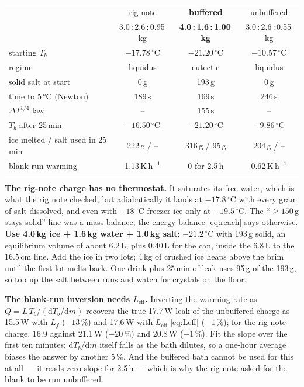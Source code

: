\documentclass[11pt,a4paper]{article}
\newcommand{\dC}{\,^{\circ}\mathrm{C}}
\begin{document}
\begin{center}\small
\begin{tabular}{@{}l c c c@{}}
\toprule
& rig note & \textbf{buffered} & unbuffered \\
& 3.0\,:\,2.6\,:\,0.95\,kg & \textbf{4.0\,:\,1.6\,:\,1.00\,kg} & 3.0\,:\,2.6\,:\,0.55\,kg \\ \midrule
starting $T_b$ & $-17.78\dC$ & $\mathbf{-21.20\dC}$ & $-10.57\dC$ \\
regime & liquidus & eutectic & liquidus \\
solid salt at start & 0\,g & 193\,g & 0\,g \\
time to 5\,°C (Newton) & 189\,s & 169\,s & 246\,s \\
\quad $\Delta T^{1/4}$ law & – & 155\,s & – \\
$T_b$ after 25\,min & $-16.50\dC$ & $-21.20\dC$ & $-9.86\dC$ \\
ice melted / salt used in 25\,min & 222\,g / – & 316\,g / 95\,g & 204\,g / – \\
blank-run warming & 1.13\,K\,h$^{-1}$ & 0 for 2.5\,h & 0.62\,K\,h$^{-1}$ \\
\bottomrule
\end{tabular}
\end{center}

\textbf{The rig-note charge has no thermostat.} It saturates its free water, which is what the
rig note checked, but adiabatically it lands at $-17.8\dC$ with every gram of salt dissolved,
and even with $-18\dC$ freezer ice only at $-19.5\dC$. The “$\geq 150$\,g stays solid” line was
a mass balance; the energy balance \eqref{eq:reach} says otherwise. \textbf{Use 4.0\,kg ice +
1.6\,kg water + 1.0\,kg salt}: $-21.2\dC$ with 193\,g solid, an equilibrium volume of about
6.2\,L, plus 0.40\,L for the can, inside the 6.8\,L to the 16.5\,cm line. Add the ice in two lots;
4\,kg of crushed ice heaps above the brim until the first lot melts back. One drink plus 25\,min
of leak uses 95\,g of the 193\,g, so top up the salt between runs and watch for crystals on the
floor.

\textbf{The blank-run inversion needs $L_{\text{eff}}$.} Inverting the warming rate as
$\dot Q = L\,\dot T_b/(\mathrm dT_b/\mathrm dm)$ recovers the true 17.7\,W leak of the unbuffered
charge as 15.5\,W with $L_f$ ($-13\,\%$) and 17.6\,W with $L_{\text{eff}}$ \eqref{eq:Leff} ($-1\,\%$); for
the rig-note charge, 16.9 against 21.1\,W ($-20\,\%$) and 20.8\,W ($-1\,\%$). Fit the slope over the
first ten minutes: $\mathrm dT_b/\mathrm dm$ itself falls as the bath dilutes, so a one-hour
average biases the answer by another 5\,\%. And the buffered bath cannot be used for this at
all — it reads zero slope for 2.5\,h — which is why the rig note asked for the blank to be run
unbuffered.
\end{document}
